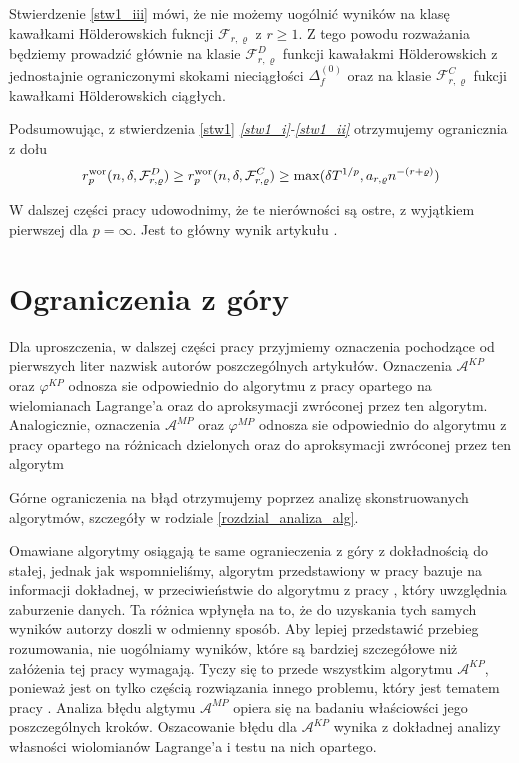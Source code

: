 \documentclass[oik, pdftex, robocza, man]{mgrwms}
\begin{document}
    Stwierdzenie \ref{stw1_iii} mówi, że nie możemy uogólnić wyników na klasę kawałkami Hölderowskich fukncji $\mathcal{F}_{r,\varrho}$ z $r \geq 1$. Z tego powodu rozważania będziemy prowadzić głównie na klasie $\mathcal{F}_{r,\varrho}^{D}$ funkcji kawałakmi Hölderowskich z jednostajnie ograniczonymi skokami nieciągłości $\Delta_{f}^{(0)}$ oraz na klasie $\mathcal{F}_{r,\varrho}^{C}$ fukcji kawałkami Hölderowskich ciągłych.

    Podsumowując, z stwierdzenia \ref{stw1} \textit{\ref{stw1_i}-\ref{stw1_ii}} otrzymujemy ogranicznia z dołu
    \begin{equation*}
        r^{\mathrm{wor}}_{p}(n, \delta, \mathcal{F}^{D}_{r,\varrho}) \geq r^{\mathrm{wor}}_{p}(n, \delta, \mathcal{F}^{C}_{r,\varrho}) \geq \max(\delta T^{1/p}, a_{r,\varrho} n^{-(r+\varrho)})
    \end{equation*}

    W dalszej części pracy udowodnimy, że te nierówności są ostre, z wyjątkiem pierwszej dla $p=\infty$. Jest to główny wynik artykułu \cite{AoP}.


\section{Ograniczenia z góry}


    Dla uproszczenia, w dalszej części pracy przyjmiemy oznaczenia pochodzące od pierwszych liter nazwisk autorów poszczególnych artykułów. Oznaczenia $\mathcal{A}^{KP}$ oraz $\varphi^{KP}$ odnosza sie odpowiednio do algorytmu z pracy \cite{CoDF} opartego na wielomianach Lagrange'a oraz do aproksymacji zwróconej przez ten algorytm. Analogicznie, oznaczenia $\mathcal{A}^{MP}$ oraz $\varphi^{MP}$ odnosza sie odpowiednio do algorytmu z pracy \cite{AoP} opartego na różnicach dzielonych oraz do aproksymacji zwróconej przez ten algorytm

    Górne ograniczenia na błąd otrzymujemy poprzez analizę skonstruowanych algorytmów, szczegóły w rodziale \ref{rozdzial_analiza_alg}.
    
    Omawiane algorytmy osiągają te same ogranieczenia z góry z dokładnością do stałej, jednak jak wspomnieliśmy, algorytm przedstawiony w pracy \cite{CoDF} bazuje na informacji dokładnej, w przeciwieństwie do algorytmu z pracy \cite{AoP}, który uwzględnia zaburzenie danych. Ta różnica wpłynęła na to, że do uzyskania tych samych wyników autorzy doszli w odmienny sposób. Aby lepiej przedstawić przebieg rozumowania, nie uogólniamy wyników, które są bardziej szczegółowe niż załóżenia tej pracy wymagają. Tyczy się to przede wszystkim algorytmu $\mathcal{A}^{KP}$, ponieważ jest on tylko częścią rozwiązania innego problemu, który jest tematem pracy \cite{CoDF}. Analiza błędu algtymu $\mathcal{A}^{MP}$ opiera się na badaniu właściowści jego poszczególnych kroków. Oszacowanie błędu dla $\mathcal{A}^{KP}$ wynika z dokładnej analizy własności wiolomianów Lagrange'a i testu na nich opartego.
\end{document}
